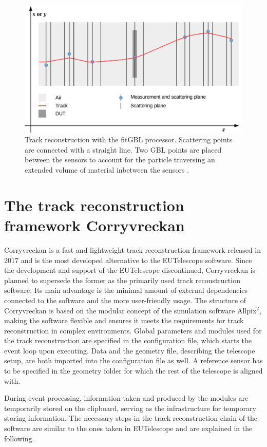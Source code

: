 \begin{figure}
  \centering
  \includegraphics[height=0.5\textwidth]{images/gbl.png}
  \caption{Track reconstruction with the fitGBL processor. Scattering points are connected with a straight line. Two GBL points are placed between the sensors
  to account for the particle traversing an extended volume of material inbetween the sensors \cite{gbl}. }
  \label{fig:gbl}
\end{figure}



\section{The track reconstruction framework Corryvreckan}
Corryvreckan is a fast and lightweight track reconstruction framework released in 2017 and is the most developed alternative to the EUTelescope software.
Since the development and support of the EUTelescope discontinued, Corryvreckan is planned to supersede the former as the primarily used track
reconstruction software. Its main advantage is the minimal amount of external dependencies connected to the software and the more user-friendly usage.
The structure of Corryvreckan is based on the modular concept of the simulation software Allpix$^2$,
making the software flexible and ensures it meets the requirements for track reconstruction in
complex environments. Global parameters and modules used for the track reconstruction are specified in the configuration file, which starts the event loop upon
executing. Data and the geometry file, describing the telescope setup, are both imported into the configuration file as well. A reference sensor has to be specified in the geometry folder
for which the rest of the telescope is aligned with.

During event processing, information taken and produced by the modules are temporarily stored on the clipboard, serving as the infrastructure for temporary
storing information. %
The necessary steps in the track reconstruction chain of the software are similar to the ones taken in EUTelescope and are explained in the following.

